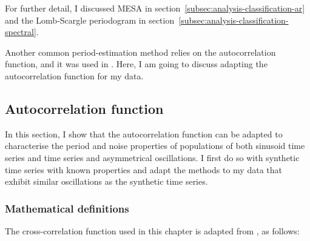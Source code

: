 For further detail, I discussed MESA in section~\ref{subsec:analysis-classification-ar} and the Lomb-Scargle periodogram in section~\ref{subsec:analysis-classification-spectral}.

Another common period-estimation method relies on the autocorrelation function, and it was used in \textcite{papagiannakisAutonomousMetabolicOscillations2017}.
Here, I am going to discuss adapting the autocorrelation function for my data.

\subsection{Autocorrelation function}
\label{subsec:analysis-characterisation-acf}

In this section, I show that the autocorrelation function can be adapted to characterise the period and noise properties of populations of both sinusoid time series and time series and asymmetrical oscillations.
I first do so with synthetic time series with known properties and adapt the methods to my data that exhibit similar oscillations as the synthetic time series.

\subsubsection{Mathematical definitions}
\label{subsubsec:analysis-characterisation-acf-maths}

The cross-correlation function used in this chapter is adapted from \textcite{pietschDeterminingGrowthRates2023}, as follows:

